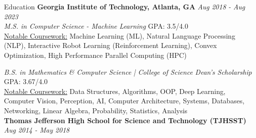 \documentclass{template} %
\begin{document}

\begin{rSection}{Education}
{\bf Georgia Institute of Technology, Atlanta, GA} \hfill {\em Aug 2018 - Aug 2023}
\\ {\em M.S. in Computer Science - Machine Learning} \hfill  GPA: 3.5/4.0
\vspace{0.1cm}
\\ \underline{Notable Coursework:} Machine Learning (ML), Natural Language Processing (NLP), Interactive Robot Learning (Reinforcement Learning), Convex Optimization, High Performance Parallel Computing (HPC)

{\em B.S. in Mathematics \& Computer Science | College of Science Dean's Scholarship} \hfill  GPA: 3.67/4.0
\vspace{0.1cm}
\\ \underline{Notable Coursework:} Data Structures, Algorithms, OOP, Deep Learning, Computer Vision, Perception, AI, Computer Architecture, Systems, Databases, Networking, Linear Algebra, Probability, Statistics, Analysis
\vspace{0.20cm}
\\ {\bf Thomas Jefferson High School for Science and Technology (TJHSST)} \hfill {\em Aug 2014 - May 2018}
\end{rSection}

\end{document}
